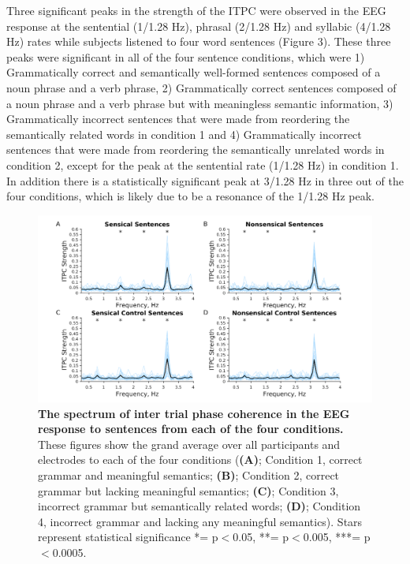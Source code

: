 \documentclass[10pt,letterpaper]{article}
\begin{document}
Three significant peaks in the strength of the ITPC were observed in the EEG response at the sentential (1/1.28 Hz), phrasal (2/1.28 Hz) and syllabic (4/1.28 Hz) rates while subjects listened to four word sentences (Figure 3). These three peaks were significant in all of the four sentence conditions, which were 1) Grammatically correct and semantically well-formed sentences composed of a noun phrase and a verb phrase, 2) Grammatically correct sentences composed of a noun phrase and a verb phrase but with meaningless semantic information, 3) Grammatically incorrect sentences that were made from reordering the semantically related words in condition 1 and 4) Grammatically incorrect sentences that were made from reordering the semantically unrelated words in condition 2, except for the peak at the sentential rate (1/1.28 Hz) in condition 1. In addition there is a statistically significant peak at 3/1.28 Hz in three out of the four conditions, which is likely due to be a resonance of the 1/1.28 Hz peak.

\begin{figure}[tbhp]
\includegraphics[width=\linewidth]{Grand_average_ITPC_per_condition_Grand_Average_ITPC_stats.png}
\caption{\textbf{The spectrum of inter trial phase coherence in the EEG response to sentences from each of the four conditions.} These figures show the grand average over all participants and electrodes to each of the four conditions (\textbf{(A)}; Condition 1, correct grammar and meaningful semantics; \textbf{(B)}; Condition 2, correct grammar but lacking meaningful semantics; \textbf{(C)}; Condition 3, incorrect grammar but semantically related words; \textbf{(D)}; Condition 4, incorrect grammar and lacking any meaningful semantics). Stars represent
statistical significance *= p$<$0.05, **= p$<$0.005, ***= p$<$0.0005.}
\label{Fig1}
\end{figure}
\end{document}
